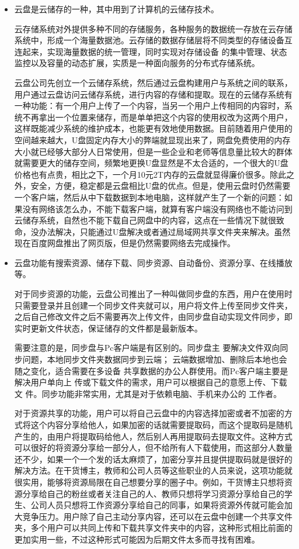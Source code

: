 \documentclass{article}
\begin{document}
\begin{itemize}
    \item 云盘是云储存的一种，其中用到了计算机的云储存技术。\par
    云存储系统对外提供多种不同的存储服务，各种服务的数据统一存放在云存储系统中，形成一个海量数据池。云存储的数据存储层将不同类型的存储设备互连起来，实现海量数据的统一管理，同时实现对存储设备
    的集中管理、状态监控以及容量的动态扩展，实质是一种面向服务的分布式存储系统。\cite{yunchucun} \par
    云盘公司先创立一个云储存系统，然后通过云盘构建用户与系统之间的联系，用户通过云盘访问云储存系统，进行内容的存储和提取。现在的云储存系统有一种功能：有一个用户上传了一个内容，当另一个用户上传相同的内容时，系统不再拿出一个位置来储存，而是单单把这个内容的使用权改为这两个用户，这样既能减少系统的维护成本，也能更有效地使用数据。目前随着用户使用的空间越来越大，U盘固定内存大小的弊端就显现出来了，网盘免费使用的内存大小就已经够大部分人日常使用，但是一些企业和老师等信息量比较大的群体就需要更大的储存空间，频繁地更换U盘显然是不太合适的，一个很大的U盘价格也有点贵，相比之下，一个月10元2T内存的云盘就显得廉价很多。除此之外，安全，方便，稳定都是云盘相比U盘的优点。但是，使用云盘时仍然需要一个客户端，然后从中下载数据到本地电脑，这样就产生了一个新的问题：如果没有网络该怎么办，不能下载客户端，就算有客户端没有网络也不能访问到云储存系统，自然也不能下载自己网盘中的内容，这点在一些情况下就很致命，没办法解决，只能通过U盘解决或者通过局域网共享文件夹来解决。虽然现在百度网盘推出了网页版，但是仍然需要网络去完成操作。
    \item 云盘功能有搜索资源、储存下载、同步资源、自动备份、资源分享、在线播放等。\par
    对于同步资源的功能，云盘公司推出了一种叫做同步盘的东西，用户在使用时只需要登录并且创建一个同步文件夹就可以，用户将文件上传至同步文件夹，之后自己修改文件之后不需要再次上传文件，由同步盘自动实现文件同步，即实时更新文件状态，保证储存的文件都是最新版本。\par
    需要注意的是，同步盘与Pc客户端是有区别的。同步盘主
    要解决文件双向同步问题，本地同步文件夹数据同步到云端；
    云端数据增加、删除后本地也会随之变化，适合需要在多设备
    共享数据的办公人群使用。而Pc客户端主要是解决用户单向上
    传或下载文件的需求，用户可以根据自己的意愿上传、下载文
    件。同步功能非常实用，尤其是对于依赖电脑、手机来办公的
    工作者。\cite{gongneng}	 \par
    对于资源共享的功能，用户可以将自己云盘中的内容选择加密或者不加密的方式将这个内容分享给他人，如果加密的话就需要提取码，而这个提取码是随机产生的，由用户将提取码给他人，然后别人再用提取码去提取文件。这种方式可以很好的将资源分享给一部分人，但不给所有人下载使用，而这部分人数量还不少，如果一个一个发的话太麻烦了，加密分享并且提供提取码就是很好的解决方法。在干货博主，教师和公司人员等这些职业的人员来说，这项功能就很实用，能够将资源局限在自己想要分享的圈子中。例如，干货博主只想将资源分享给自己的粉丝或者关注自己的人、教师只想将学习资源分享给自己的学生、公司人员只想将工作资源分享给自己的同事，如果将资源外传就可能会加大竞争压力。用户除了自己主动分享内容，还可以在云盘中创建一个共享文件夹，多个用户可以共同上传和下载共享文件夹中的内容，这种形式相比前面的更加实用一些，不过这种形式可能因为后期文件太多而寻找有困难。 \par

\end{itemize}
\end{document}
